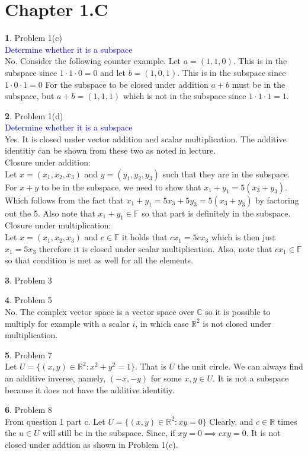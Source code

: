 \documentclass[10pt, twocolumn]{article}
\newcommand{\C}{\mathbb{C}}
\newcommand{\question}[1]{\textcolor{blue}{#1} \\}
\newcommand{\R}{\mathbb{R}}
\theoremstyle{definition}
\newtheorem{q}{}
\begin{document}
\section{Chapter 1.C}
\begin{q}
    Problem 1(c) \\
    \question{Determine whether it is a subspace}
    No. Consider the following counter example. 
    Let $ a = (1, 1, 0) $. This is in the subspace since $ 1 \cdot 1 \cdot 0 = 0 $ 
    and let  $ b = (1, 0, 1) $. This is in the subspace since $ 1 \cdot 0 \cdot 1 = 0 $ 
    For the subspace to be closed under addition $ a + b $ must be in the subspace, 
    but $ a + b = (1, 1, 1) $ which is not in the subspace since $ 1 \cdot 1 \cdot 1 = 1 $.
\end{q}
\begin{q}
    Problem 1(d) \\
    \question{Determine whether it is a subspace}
    Yes. It is closed under vector addition and scalar multiplication. The additive identitiy can be shown from these two as noted in lecture.\\
    Closure under addition: \\
    Let $ x = (x_1, x_2, x_3) $ and $ y = (y_1, y_2, y_3) $ such that they are in the subspace.
    For $ x + y $ to be in the subspace, we need to show that $ x_1 + y_1 = 5(x_3 + y_3) $. 
    Which follows from the fact that $ x_1 + y_1 = 5x_3 + 5y_3 = 5(x_3 + y_3) $  by factoring out the 5. 
    Also note that $ x_1 + y_1 \in \mathbb{F} $ so that part is definitely in the subspace.
    Closure under multiplication: \\
    Let $ x = (x_1, x_2, x_3) $ and $ c \in \mathbb{F} $ it holds that $ c x_1 = 5c x_3 $ which is then just $ x_1 = 5 x_3 $ 
    therefore it is closed under scalar multiplication. Also, note that $ cx_1 \in \mathbb{F} $ so that condition is met as well for all the elements.
\end{q}
\begin{q}
    Problem 3 \\
\end{q}
\begin{q}
    Problem 5 \\
    No. The complex vector space is a vector space over $ \C $ so it is possible to multiply for example with a scalar $ i $, 
    in which case $ \R^2 $ is not closed under multiplication.
\end{q}
\begin{q}
    Problem 7 \\
    Let $ U = \{(x, y) \in \R^2 : x^2 + y^2 = 1\} $. That is $ U $ the unit circle. 
    We can always find an additive inverse, namely, $(-x, -y)$ for some $ x, y \in U $. 
    It is not a subspace because it does not have the additive identitiy.
\end{q}
\begin{q}
    Problem 8 \\
    From question 1 part c. 
    Let $U =\{(x, y) \in \R^2 : xy = 0\} $
    Clearly, and $ c \in \R $ times the $ u \in U $ will still be in the subspace. Since, if $ xy = 0 \implies cxy = 0 $. 
    It is not closed under addtion as shown in Problem 1(c).
\end{q}
\end{document}
